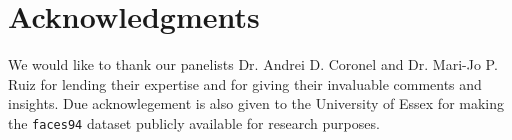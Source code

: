 \documentclass{sig-alternate-05-2015}
\begin{document}
\printccsdesc
{}




\section{Acknowledgments}
We would like to thank our panelists Dr. Andrei D. Coronel and Dr. Mari-Jo P. Ruiz for lending their expertise and for giving their invaluable comments and insights.
Due acknowlegement is also given to the University of Essex for making the \texttt{faces94} dataset publicly available for research purposes.


% 

\balancecolumns

% 
\end{document}
